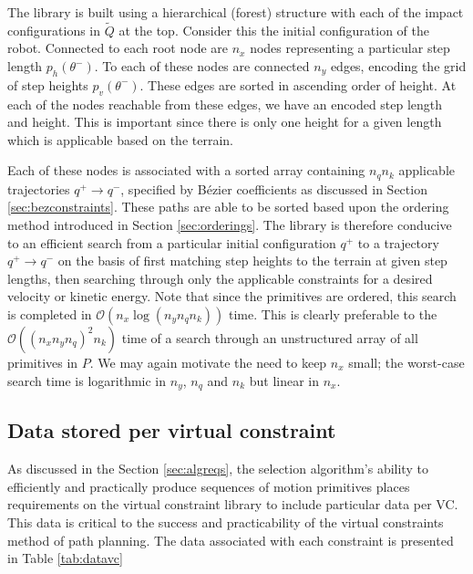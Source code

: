 The library is built using a hierarchical (forest) structure with each of the impact configurations in $\tilde{Q}$ at the top. Consider this the initial configuration of the robot. Connected to each root node are $n_x$ nodes representing a particular step length $p_h(\theta^-)$. To each of these nodes are connected $n_y$ edges, encoding the grid of step heights $p_v(\theta^-)$. These edges are sorted in ascending order of height. At each of the nodes reachable from these edges, we have an encoded step length and height. This is important since there is only one height for a given length which is applicable based on the terrain.

Each of these nodes is associated with a sorted array containing $n_qn_k$ applicable trajectories $q^+ \to q^-$, specified by Bézier coefficients as discussed in Section \ref{sec:bezconstraints}. These paths are able to be sorted based upon the ordering method introduced in Section \ref{sec:orderings}. The library is therefore conducive to an efficient search from a particular initial configuration $q^+$ to a trajectory $q^+ \to q^-$ on the basis of first matching step heights to the terrain at given step lengths, then searching through only the applicable constraints for a desired velocity or kinetic energy. Note that since the primitives are ordered, this search is completed in $\mathcal{O}(n_x\log(n_yn_qn_k))$ time. This is clearly preferable to the $\mathcal{O}\left((n_xn_yn_q)^2n_k\right)$ time of a search through an unstructured array of all primitives in $P$. We may again motivate the need to keep $n_x$ small; the worst-case search time is logarithmic in $n_y$, $n_q$ and $n_k$ but linear in $n_x$.

\subsection{Data stored per virtual constraint}
As discussed in the Section \ref{sec:algreqs}, the selection algorithm's ability to efficiently and practically produce sequences of motion primitives places requirements on the virtual constraint library to include particular data per VC. This data is critical to the success and practicability of the virtual constraints method of path planning. The data associated with each constraint is presented in Table \ref{tab:datavc}

